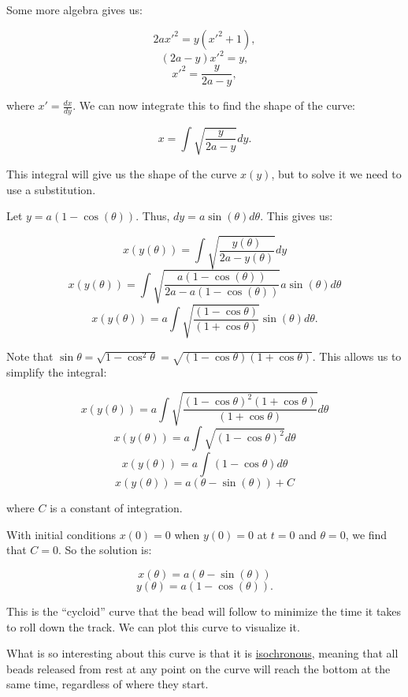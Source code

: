 \documentclass[11pt]{article}
\begin{document}
Some more algebra gives us:

\[2ax'^2 = y(x'^2 + 1),\] \[(2a - y)x'^2 = y,\]
\[x'^2 = \frac{y}{2a - y},\]

where \(x' = \frac{dx}{dy}\). We can now integrate this to find the
shape of the curve:

\[x = \int \sqrt{\frac{y}{2a - y}} dy.\]

This integral will give us the shape of the curve \(x(y)\), but to solve
it we need to use a substitution.

Let \(y = a(1 - \cos(\theta))\). Thus, \(dy = a\sin(\theta)d\theta\).
This gives us:

\[x(y(\theta)) = \int \sqrt{\frac{y(\theta)}{2a - y(\theta)}} dy\]
\[x(y(\theta)) = \int \sqrt{\frac{a(1 - \cos(\theta))}{2a - a(1 - \cos(\theta))}} a\sin(\theta)d\theta\]
\[x(y(\theta)) = a \int \sqrt{\frac{(1-\cos\theta)}{(1+\cos\theta)}} \sin(\theta)d\theta.\]

Note that
\(\sin \theta = \sqrt{1 - \cos^2 \theta} = \sqrt{(1 - \cos\theta)(1 + \cos\theta)}\).
This allows us to simplify the integral:

\[x(y(\theta)) = a \int \sqrt{\frac{(1-\cos\theta)^2(1+\cos\theta)}{(1+\cos\theta)}} d\theta\]
\[x(y(\theta)) = a \int \sqrt{(1 - \cos\theta)^2} d\theta\]
\[x(y(\theta)) = a \int (1 - \cos\theta) d\theta\]
\[x(y(\theta)) = a \left(\theta - \sin(\theta)\right) + C\]

where \(C\) is a constant of integration.

With initial conditions \(x(0) = 0\) when \(y(0) = 0\) at \(t=0\) and
\(\theta = 0\), we find that \(C = 0\). So the solution is:

\[x(\theta) = a\left(\theta - \sin(\theta)\right)\]
\[y(\theta) = a(1 - \cos(\theta)).\]

This is the ``cycloid'' curve that the bead will follow to minimize the
time it takes to roll down the track. We can plot this curve to
visualize it.

What is so interesting about this curve is that it is
\href{https://en.wikipedia.org/wiki/Isochronous}{isochronous}, meaning
that all beads released from rest at any point on the curve will reach
the bottom at the same time, regardless of where they start.
\end{document}
